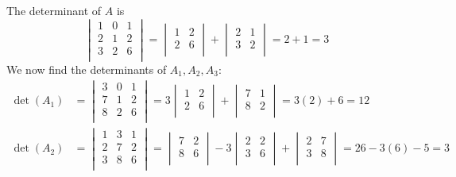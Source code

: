 \documentclass{article}
\begin{document}
The determinant of \(A\) is 
\[
  \begin{vmatrix}
    1 &0  &1   \\
    2&1  &2   \\
    3&2  &6   \\
  \end{vmatrix}=\begin{vmatrix}
    1 &2   \\
     2&6   \\
  \end{vmatrix}+\begin{vmatrix}
    2 &1   \\
     3&2   \\
  \end{vmatrix}=2+1=3
\]
We now find the determinants of \(A_1,A_2,A_3\):
\begin{align*}
  \det (A_1)&=\begin{vmatrix}
    3 &0  &1   \\
    7&1  &2   \\
    8&2  &6   \\
  \end{vmatrix}=3\begin{vmatrix}
    1 &2   \\
     2&6   \\
  \end{vmatrix}+\begin{vmatrix}
    7 &1   \\
     8&2   \\
  \end{vmatrix}=3(2)+6=12\\
  \det (A_2)&=\begin{vmatrix}
    1 &3  &1   \\
    2&7  &2   \\
    3&8  &6   \\
  \end{vmatrix}=\begin{vmatrix}
    7 &2   \\
     8&6   \\
  \end{vmatrix}-3\begin{vmatrix}
    2 &2   \\
     3&6   \\
  \end{vmatrix}+\begin{vmatrix}
    2 &7   \\
     3&8   \\
  \end{vmatrix}=26-3(6)-5=3\\

\end{align*}
\end{document}
